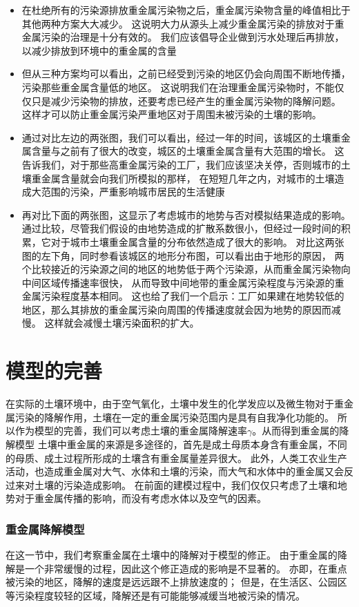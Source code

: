 \documentclass[a4paper]{article}
\begin{document}
\begin{itemize}
\item 在杜绝所有的污染源排放重金属污染物之后，重金属污染物含量的峰值相比于其他两种方案大大减少。
这说明大力从源头上减少重金属污染的排放对于重金属污染的治理是十分有效的。
我们应该倡导企业做到污水处理后再排放，以减少排放到环境中的重金属的含量
\item 但从三种方案均可以看出，之前已经受到污染的地区仍会向周围不断地传播，污染那些重金属含量低的地区。
这说明我们在治理重金属污染物时，不能仅仅只是减少污染物的排放，还要考虑已经产生的重金属污染物的降解问题。
这样才可以防止重金属污染严重地区对于周围未被污染的土壤的影响。
\item 通过对比左边的两张图，我们可以看出，经过一年的时间，该城区的土壤重金属含量与之前有了很大的改变，城区的土壤重金属含量有大范围的增长。
这告诉我们，对于那些高重金属污染的工厂，我们应该坚决关停，否则城市的土壤重金属含量就会向我们所模拟的那样，
在短短几年之内，对城市的土壤造成大范围的污染，严重影响城市居民的生活健康
\item 再对比下面的两张图，这显示了考虑城市的地势与否对模拟结果造成的影响。
通过比较，尽管我们假设的由地势造成的扩散系数很小，但经过一段时间的积累，它对于城市土壤重金属含量的分布依然造成了很大的影响。
对比这两张图的左下角，同时参看该城区的地形分布图，可以看出由于地形的原因，
两个比较接近的污染源之间的地区的地势低于两个污染源，从而重金属污染物向中间区域传播速率很快，
从而导致中间地带的重金属污染程度与污染源的重金属污染程度基本相同。
这也给了我们一个启示：工厂如果建在地势较低的地区，那么其排放的重金属污染向周围的传播速度就会因为地势的原因而减慢。
这样就会减慢土壤污染面积的扩大。
\end{itemize}
\part{模型的完善}
在实际的土壤环境中，由于空气氧化，土壤中发生的化学发应以及微生物对于重金属污染的降解作用，土壤在一定的重金属污染范围内是具有自我净化功能的。
所以作为模型的完善，我们可以考虑土壤的重金属降解速率$\gamma$。从而得到重金属的降解模型
土壤中重金属的来源是多途径的，首先是成土母质本身含有重金属，不同的母质、成土过程所形成的土壤含有重金属量差异很大。
此外，人类工农业生产活动，也造成重金属对大气、水体和土壤的污染，而大气和水体中的重金属又会反过来对土壤的污染造成影响。
在前面的建模过程中，我们仅仅只考虑了土壤和地势对于重金属传播的影响，而没有考虑水体以及空气的因素。
\section{重金属降解模型}
在这一节中，我们考察重金属在土壤中的降解对于模型的修正。
由于重金属的降解是一个非常缓慢的过程，因此这个修正造成的影响是不显著的。
亦即，在重点被污染的地区，降解的速度是远远跟不上排放速度的；
但是，在生活区、公园区等污染程度较轻的区域，降解还是有可能能够减缓当地被污染的情况。
\end{document}
